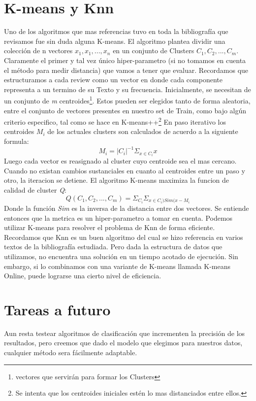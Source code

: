 \documentclass[a4paper,11pt]{report}
\begin{document}
\chapter{K-means y Knn}
Uno de los algoritmos que mas referencias tuvo en toda la bibliografía que revisamos fue sin duda alguna K-means. El algoritmo plantea dividir una colección de n vectores $ {x_{1}, x_{1}, ... , x_{n}} $ en un conjunto de Clusters $ {C_{1}, C_{2}, ... , C_{m}} $. Claramente el primer y tal vez único hiper-parametro (si no tomamos en cuenta el método para medir distancia) que vamos a tener que evaluar. 
Recordamos que estructuramos a cada review como un vector en donde cada componente representa a un termino de su Texto y su frecuencia.
Inicialmente, se necesitan de un conjunto de \textit{m} centroides\footnote{vectores que servirán para formar los Clusters}. Estos pueden ser elegidos tanto de forma aleatoria, entre el conjunto de vectores presentes en nuestro set de Train, como bajo algún criterio especifico, tal como se hace en K-means++\footnote{Se intenta que los centroides iniciales estén lo mas distanciados entre ellos.}
En paso iterativo los centroides $ M_{i} $ de los actuales clusters son calculados de acuerdo a la siguiente formula:
\[ M_{i} = |C_{i}| ^{-1} \Sigma _{x \in C_{i}} x \]
Luego cada vector es reasignado al cluster cuyo centroide sea el mas cercano. Cuando no existan cambios sustanciales en cuanto al centroides entre un paso y otro, la iteracion se detiene.
El algoritmo K-means maximiza la funcion de calidad de cluster \textit{Q}:
\[ Q(C_{1}, C_{2}, ... , C_{m}) = \Sigma _{C_{i}} \Sigma _{x \in C_{i}) Sim(x - M_{i}} \]
Donde la función \textit{Sim} es la inversa de la distancia entre dos vectores. Se entiende entonces que la metrica es un hiper-parametro a tomar en cuenta. 
Podemos utilizar K-means para resolver el problema de Knn de forma eficiente. Recordamos que Knn es un buen algoritmo del cual se hizo referencia en varios textos de la bibliografía estudiada. Pero dada la estructura de datos que utilizamos, no encuentra una solución en un tiempo acotado de ejecución. Sin embargo, si lo combinamos con una variante de K-means llamada K-means Online, puede lograrse una cierto nivel de eficiencia. 


\chapter{Tareas a futuro}
Aun resta testear algoritmos de clasificación que incrementen la precisión de los resultados, pero creemos que dado el modelo que elegimos para nuestros datos, cualquier método sera fácilmente adaptable.
\end{document}
